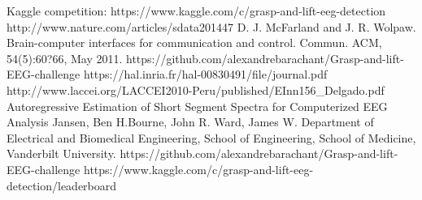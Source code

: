 \documentclass[final,leqno,onefignum,onetabnum]{siamltexmm}
\begin{document}
  \begin{thebibliography}{1}
     Kaggle competition:  https://www.kaggle.com/c/grasp-and-lift-eeg-detection
     http://www.nature.com/articles/sdata201447
    D. J. McFarland and J. R. Wolpaw. Brain-computer interfaces for communication and control.
Commun. ACM, 54(5):60?66, May 2011.
    https://github.com/alexandrebarachant/Grasp-and-lift-EEG-challenge
    https://hal.inria.fr/hal-00830491/file/journal.pdf
    http://www.laccei.org/LACCEI2010-Peru/published/EInn156\_Delgado.pdf
    Autoregressive Estimation of Short Segment Spectra for Computerized EEG Analysis Jansen, Ben H.Bourne, John R. Ward, James W. Department of Electrical and Biomedical Engineering, School of
Engineering, School of Medicine, Vanderbilt University. 
    https://github.com/alexandrebarachant/Grasp-and-lift-EEG-challenge
    https://www.kaggle.com/c/grasp-and-lift-eeg-detection/leaderboard
  \end{thebibliography} 


  
\end{document}
